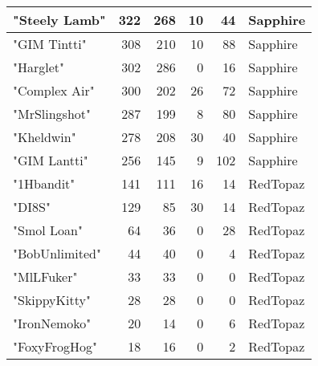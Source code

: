 \documentclass{article}
\begin{document}
\begin{table}[htbp]
\begin{tabular}{|l|r|r|r|r|l|}
"Steely Lamb" & 322 & 268 & 10 & 44 & Sapphire \\ \hline
"GIM Tintti" & 308 & 210 & 10 & 88 & Sapphire \\ \hline
"Harglet" & 302 & 286 & 0 & 16 & Sapphire \\ \hline
"Complex Air" & 300 & 202 & 26 & 72 & Sapphire \\ \hline
"MrSlingshot" & 287 & 199 & 8 & 80 & Sapphire \\ \hline
"Kheldwin" & 278 & 208 & 30 & 40 & Sapphire \\ \hline
"GIM Lantti" & 256 & 145 & 9 & 102 & Sapphire \\ \hline
"1Hbandit" & 141 & 111 & 16 & 14 & RedTopaz \\ \hline
"DI8S" & 129 & 85 & 30 & 14 & RedTopaz \\ \hline
"Smol Loan" & 64 & 36 & 0 & 28 & RedTopaz \\ \hline
"BobUnlimited" & 44 & 40 & 0 & 4 & RedTopaz \\ \hline
"MlLFuker" & 33 & 33 & 0 & 0 & RedTopaz \\ \hline
"SkippyKitty" & 28 & 28 & 0 & 0 & RedTopaz \\ \hline
"IronNemoko" & 20 & 14 & 0 & 6 & RedTopaz \\ \hline
"FoxyFrogHog" & 18 & 16 & 0 & 2 & RedTopaz \\ \hline
\end{tabular}
\end{table}
\end{document}
